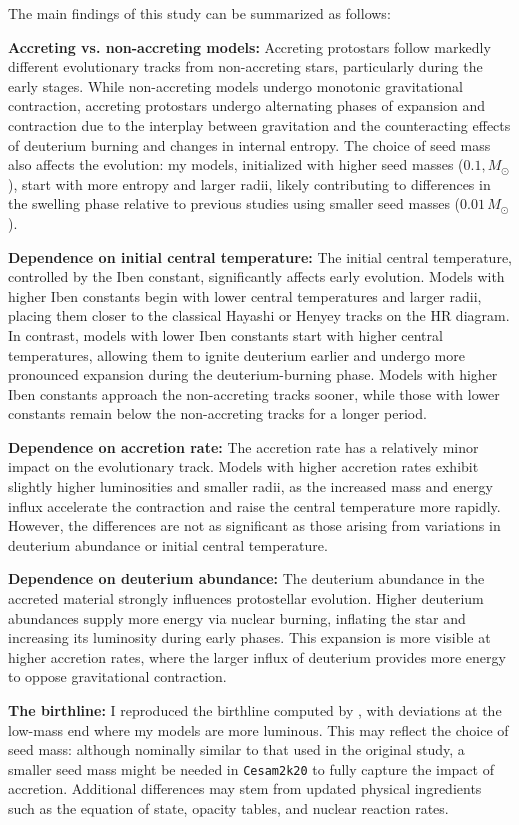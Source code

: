 \documentclass[12pt,a4paper]{article}
\begin{document}
The main findings of this study can be summarized as follows:

\textbf{Accreting vs. non-accreting models:} Accreting protostars follow markedly different evolutionary tracks from non-accreting stars, particularly during the early stages. While non-accreting models undergo monotonic gravitational contraction, accreting protostars undergo alternating phases of expansion and contraction due to the interplay between gravitation and the counteracting effects of deuterium burning and changes in internal entropy. The choice of seed mass also affects the evolution: my models, initialized with higher seed masses ($0.1,M_\odot$), start with more entropy and larger radii, likely contributing to differences in the swelling phase relative to previous studies using smaller seed masses ($0.01\,M_\odot$).

\textbf{Dependence on initial central temperature:} The initial central temperature, controlled by the Iben constant, significantly affects early evolution. Models with higher Iben constants begin with lower central temperatures and larger radii, placing them closer to the classical Hayashi or Henyey tracks on the HR diagram. In contrast, models with lower Iben constants start with higher central temperatures, allowing them to ignite deuterium earlier and undergo more pronounced expansion during the deuterium-burning phase. Models with higher Iben constants approach the non-accreting tracks sooner, while those with lower constants remain below the non-accreting tracks for a longer period.

\textbf{Dependence on accretion rate:} The accretion rate has a relatively minor impact on the evolutionary track. Models with higher accretion rates exhibit slightly higher luminosities and smaller radii, as the increased mass and energy influx accelerate the contraction and raise the central temperature more rapidly. However, the differences are not as significant as those arising from variations in deuterium abundance or initial central temperature.

\textbf{Dependence on deuterium abundance:} The deuterium abundance in the accreted material strongly influences protostellar evolution. Higher deuterium abundances supply more energy via nuclear burning, inflating the star and increasing its luminosity during early phases. This expansion is more visible at higher accretion rates, where the larger influx of deuterium provides more energy to oppose gravitational contraction.

\textbf{The birthline:} I reproduced the birthline computed by \textcite{PallaStahler1993}, with deviations at the low-mass end where my models are more luminous. This may reflect the choice of seed mass: although nominally similar to that used in the original study, a smaller seed mass might be needed in \texttt{Cesam2k20} to fully capture the impact of accretion. Additional differences may stem from updated physical ingredients such as the equation of state, opacity tables, and nuclear reaction rates.
\end{document}
